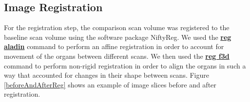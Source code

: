 \documentclass[]{spie}  %
\begin{document}
\subsection{Image Registration}

For the registration step, the comparison scan volume was registered to the baseline scan volume using the software package NiftyReg. We used the \textbf{\href{http://cmictig.cs.ucl.ac.uk/wiki/index.php/Reg_aladin}{reg aladin}} command to perform an affine registration\cite{Ourselin01} in order to account for movement of the organs between different scans. We then used the \textbf{\href{http://cmictig.cs.ucl.ac.uk/wiki/index.php/Reg_f3d}{reg f3d}} command to perform non-rigid registration\cite{Modat10} in order to align the organs in such a way that accounted for changes in their shape between scans. Figure \ref{beforeAndAfterReg} shows an example of image slices before and after registration. 
\end{document}

